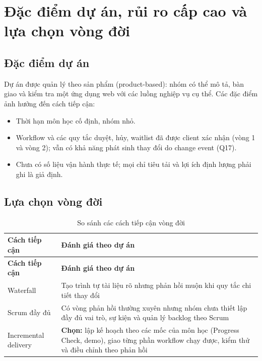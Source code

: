 \section{Đặc điểm dự án, rủi ro cấp cao và lựa chọn vòng đời}
\label{sec:1-8}

\subsection*{Đặc điểm dự án}
Dự án được quản lý theo sản phẩm (product-based): nhóm có thể mô tả, bàn giao và kiểm tra một ứng dụng web với các luồng nghiệp vụ cụ thể. Các đặc điểm ảnh hưởng đến cách tiếp cận:
\begin{itemize}
  \item Thời hạn môn học cố định, nhóm nhỏ.
  \item Workflow và các quy tắc duyệt, hủy, waitlist đã được client xác nhận (vòng 1 và vòng 2); vẫn có khả năng phát sinh thay đổi do change event (Q17).
  \item Chưa có số liệu vận hành thực tế; mọi chỉ tiêu tải và lợi ích định lượng phải ghi là giả định.
\end{itemize}

\subsection*{Lựa chọn vòng đời}
\begingroup\tblsetup\tblzebra
\begin{longtable}{L{3.0cm}L{11.0cm}}
\caption{So sánh các cách tiếp cận vòng đời}\label{tab:lifecycle}\\
\toprule
{}\textbf{Cách tiếp cận} & \textbf{Đánh giá theo dự án} \\
\midrule
\endfirsthead
\toprule
{}\textbf{Cách tiếp cận} & \textbf{Đánh giá theo dự án} \\
\midrule
\endhead
\bottomrule
\endlastfoot
Waterfall & Tạo trình tự tài liệu rõ nhưng phản hồi muộn khi quy tắc chi tiết thay đổi \\
Scrum đầy đủ & Có vòng phản hồi thường xuyên nhưng nhóm chưa thiết lập đầy đủ vai trò, sự kiện và quản lý backlog theo Scrum \\
Incremental delivery & \textbf{Chọn:} lập kế hoạch theo các mốc của môn học (Progress Check, demo), giao từng phần workflow chạy được, kiểm thử và điều chỉnh theo phản hồi \\
\end{longtable}
\endgroup

